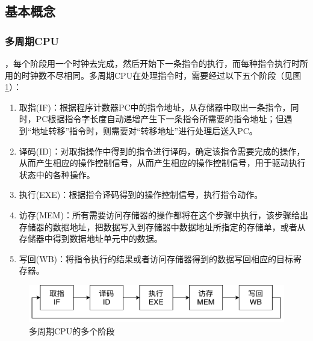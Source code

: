 
\subsection{基本概念}
\subsubsection{多周期CPU}
，每个阶段用一个时钟去完成，然后开始下一条指令的执行，而每种指令执行时所用的时钟数不尽相同。多周期CPU在处理指令时，需要经过以下五个阶段（见图\ref{fig:phases}）：
\begin{enumerate}
	\item 取指(IF)：根据程序计数器PC中的指令地址，从存储器中取出一条指令，同时，PC根据指令字长度自动递增产生下一条指令所需要的指令地址；但遇到``地址转移''指令时，则需要对``转移地址''进行处理后送入PC。
	\item 译码(ID)：对取指操作中得到的指令进行译码，确定该指令需要完成的操作，从而产生相应的操作控制信号，从而产生相应的操作控制信号，用于驱动执行状态中的各种操作。
	\item 执行(EXE)：根据指令译码得到的操作控制信号，执行指令动作。
	\item 访存(MEM)：所有需要访问存储器的操作都将在这个步骤中执行，该步骤给出存储器的数据地址，把数据写入到存储器中数据地址所指定的存储单，或者从存储器中得到数据地址单元中的数据。
	\item 写回(WB)：将指令执行的结果或者访问存储器得到的数据写回相应的目标寄存器。
\end{enumerate}
\begin{figure}[H]
\centering
\includegraphics[width=0.6\linewidth]{fig/Phases.pdf}
\caption{多周期CPU的多个阶段}
\label{fig:phases}
\end{figure}

